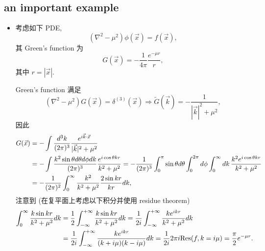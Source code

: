 \subsection{an important example} \label{subsection A.2.1}
\begin{itemize}
	\item 考虑如下 PDE,
	\begin{equation}
		(\nabla^2 - \mu^2) \phi(\vec{x}) = f(\vec{x}),
	\end{equation}
	其 Green's function 为
	\begin{equation}
		G(\vec{x}) = - \frac{1}{4 \pi} \frac{e^{- \mu r}}{r},
	\end{equation}
	其中 $r = |\vec{x}|$.
	
	\begin{tcolorbox}[title=calculation:]
		Green's function 满足
		\begin{equation}
			(\nabla^2 - \mu^2) G(\vec{x}) = \delta^{(3)}(\vec{x}) \Longrightarrow \tilde{G}(\vec{k}) = - \frac{1}{|\vec{k}|^2 + \mu^2},
		\end{equation}
		因此
		\begin{align}
			G(\vec{x}) &= - \int \frac{d^3 k}{(2 \pi)^3} \frac{e^{i \vec{k} \cdot \vec{x}}}{|\vec{k}|^2 + \mu^2} \notag \\
			&= - \int \frac{k^2 \sin \theta d\theta d\phi dk}{(2 \pi)^3} \frac{e^{i \cos \theta k r}}{k^2 + \mu^2} = - \frac{1}{(2 \pi)^3} \int_0^\pi \sin \theta d\theta \int_0^{2 \pi} d\phi \int_0^\infty dk \, \frac{k^2 e^{i \cos \theta k r}}{k^2 + \mu^2} \notag \\
			&= - \frac{1}{(2 \pi)^2} \int_0^\infty \frac{k^2}{k^2 + \mu^2} \frac{2 \sin k r}{k r} dk,
		\end{align}
		注意到 (在复平面上考虑以下积分并使用 residue theorem)
		\begin{align}
			\int_0^\infty \frac{k \sin k r}{k^2 + \mu^2} dk &= \frac{1}{2} \int_{- \infty}^{+ \infty} \frac{k \sin k r}{k^2 + \mu^2} dk = \frac{1}{2 i} \int_{- \infty}^{+ \infty} \frac{k e^{i k r}}{k^2 + \mu^2} dk \notag \\
			&= \frac{1}{2 i} \int_{- \infty}^{+ \infty} \frac{k e^{i k r}}{(k + i \mu) (k - i \mu)} dk = \frac{1}{2 i} 2 \pi i \mathrm{Res}(f, k = i \mu) = \frac{\pi}{2} e^{- \mu r}.
		\end{align}
	\end{tcolorbox}
\end{itemize}

